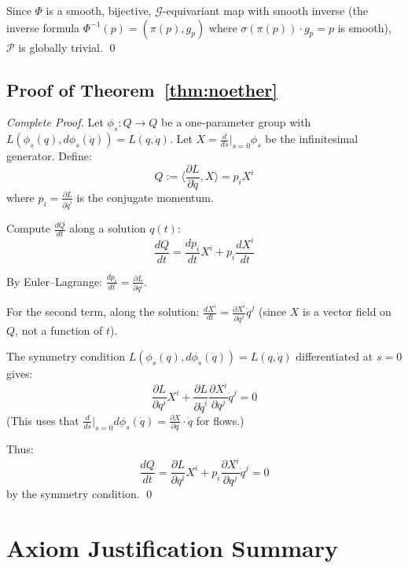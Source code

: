 \documentclass[11pt]{article}
\begin{document}
Since $\Phi$ is a smooth, bijective, $\mathcal{G}$-equivariant map with smooth inverse (the inverse formula
$\Phi^{-1}(p) = (\pi(p), g_p)$ where $\sigma(\pi(p)) \cdot g_p = p$ is smooth), $\mathcal{P}$ is globally trivial.
\qed

\subsection{Proof of Theorem~\ref{thm:noether}}

\textit{Complete Proof.} Let $\phi_s : Q \to Q$ be a one-parameter group with $L(\phi_s(q), d\phi_s(\dot{q})) = L(q, \dot{q})$.
Let $X = \frac{d}{ds}|_{s=0}\phi_s$ be the infinitesimal generator. Define:
\[
Q := \langle \frac{\partial L}{\partial \dot{q}}, X \rangle = p_i X^i
\]
where $p_i = \frac{\partial L}{\partial \dot{q}^i}$ is the conjugate momentum.

Compute $\frac{dQ}{dt}$ along a solution $q(t)$:
\[
\frac{dQ}{dt} = \frac{dp_i}{dt} X^i + p_i \frac{dX^i}{dt}
\]

By Euler--Lagrange: $\frac{dp_i}{dt} = \frac{\partial L}{\partial q^i}$.

For the second term, along the solution: $\frac{dX^i}{dt} = \frac{\partial X^i}{\partial q^j}\dot{q}^j$ (since $X$ is a vector field on $Q$, not a
function of $t$).

The symmetry condition $L(\phi_s(q), d\phi_s(\dot{q})) = L(q, \dot{q})$ differentiated at $s = 0$ gives:
\[
\frac{\partial L}{\partial q^i} X^i + \frac{\partial L}{\partial \dot{q}^i}\frac{\partial X^i}{\partial q^j}\dot{q}^j = 0
\]
(This uses that $\frac{d}{ds}|_{s=0} d\phi_s(\dot{q}) = \frac{\partial X}{\partial q} \cdot \dot{q}$ for flows.)

Thus:
\[
\frac{dQ}{dt} = \frac{\partial L}{\partial q^i} X^i + p_i \frac{\partial X^i}{\partial q^j}\dot{q}^j = 0
\]
by the symmetry condition.
\qed

\section{Axiom Justification Summary}
\end{document}
